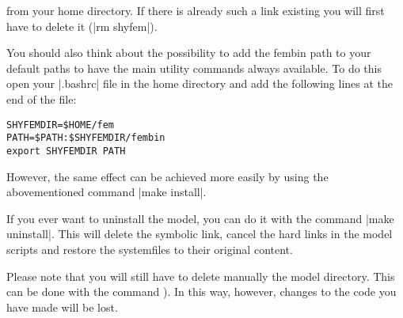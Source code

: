 from your home directory. If there is already such a link existing you
will first have to delete it (|rm shyfem|).

You should also think about the possibility to add the fembin path to your
default paths to have the main utility commands always available. To do
this open your |.bashrc| file in the home directory and add the following
lines at the end of the file:

\begin{verbatim}
SHYFEMDIR=$HOME/fem
PATH=$PATH:$SHYFEMDIR/fembin
export SHYFEMDIR PATH
\end{verbatim}

However, the same effect can be achieved more easily by using the
abovementioned command |make install|.

If you ever want to uninstall the model, you can do it with the command
|make uninstall|. This will delete the symbolic link, cancel the hard
links in the model scripts and restore the systemfiles \ttt{\sysfiles}
to their original content.

Please note that you will still have to delete manually the model
directory. This can be done with the command ). In
this way, however, changes to the code you have made will be lost.


